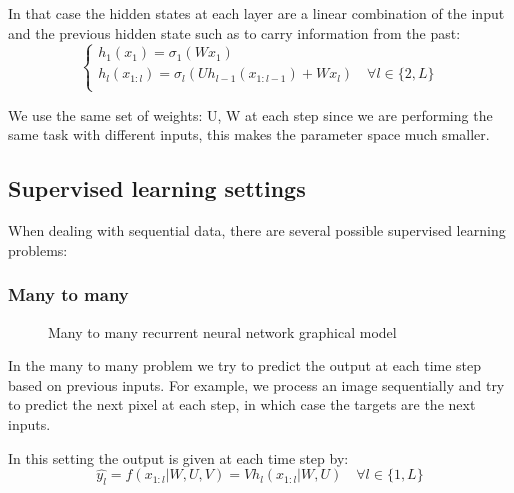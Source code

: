 \documentclass[11pt,oneside,openright]{report}
\begin{document}
In that case the hidden states at each layer are a linear combination of the input and the previous hidden state such as to carry information from the past:
  \begin{equation}
    \begin{cases}
          h_1(x_1) = \sigma_1(W x_1) \\
          h_l(x_{1:l}) = \sigma_l (U h_{l-1}(x_{1:l-1}) + W x_l) \quad \forall l \in \{2, L\}\\
    \end{cases}
  \end{equation}

We use the same set of weights: U, W at each step since we are performing the same task with different inputs, this makes the parameter space much smaller.

\subsection{Supervised learning settings}
When dealing with sequential data, there are several possible supervised learning problems:
\subsubsection{Many to many}
\begin{figure}[H]
\centering
{}
\caption{Many to many recurrent neural network graphical model}
\end{figure}
In the many to many problem we try to predict the output at each time step based on previous inputs. For example, we process an image sequentially and try to predict the next pixel at each step, in which case the targets are the next inputs.

In this setting the output is given at each time step by:
$$ \hat{y_l} = f(x_{1:l}|W, U, V) = V h_l(x_{1:l}|W,U)\quad \forall l \in \{1, L\}$$
\end{document}
